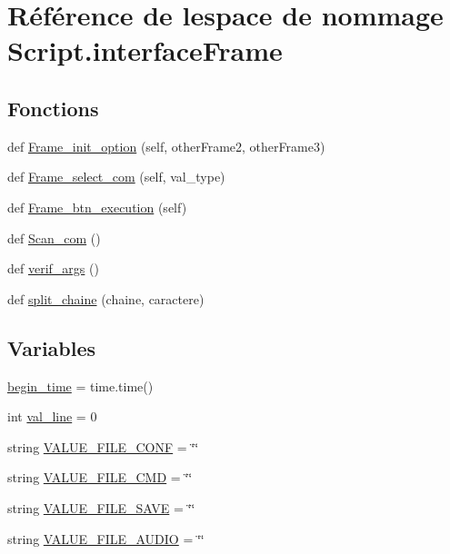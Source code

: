 \hypertarget{namespaceScript_1_1interfaceFrame}{}\section{Référence de l\textquotesingle{}espace de nommage Script.\+interface\+Frame}
\label{namespaceScript_1_1interfaceFrame}
\subsection*{Fonctions}
\begin{DoxyCompactItemize}
\item 
def \hyperlink{namespaceScript_1_1interfaceFrame_aa7f559f2c9e8af048daa456cb3686155}{Frame\+\_\+init\+\_\+option} (self, other\+Frame2, other\+Frame3)
\item 
def \hyperlink{namespaceScript_1_1interfaceFrame_a3538cb8357b74776a380240ed3221bc0}{Frame\+\_\+select\+\_\+com} (self, val\+\_\+type)
\item 
def \hyperlink{namespaceScript_1_1interfaceFrame_ae94a2df22674070fddf2ae5197a09a6f}{Frame\+\_\+btn\+\_\+execution} (self)
\item 
def \hyperlink{namespaceScript_1_1interfaceFrame_a76119121c3aceb43846ba3ea526623ad}{Scan\+\_\+com} ()
\item 
def \hyperlink{namespaceScript_1_1interfaceFrame_a7a90dd83e0b67edcf2dee870d927e98e}{verif\+\_\+args} ()
\item 
def \hyperlink{namespaceScript_1_1interfaceFrame_ab554e77db5080fb2eae78e39ebbeb395}{split\+\_\+chaine} (chaine, caractere)
\end{DoxyCompactItemize}
\subsection*{Variables}
\begin{DoxyCompactItemize}
\item 
\hyperlink{namespaceScript_1_1interfaceFrame_ab8e385a4d6a1f87628b963bc0a385519}{begin\+\_\+time} = time.\+time()
\item 
int \hyperlink{namespaceScript_1_1interfaceFrame_ace1207561541cc3ee3af9b2f33b2a316}{val\+\_\+line} = 0
\item 
string \hyperlink{namespaceScript_1_1interfaceFrame_a2cfacdb24b52e8cf5d9667d91a5c58ab}{V\+A\+L\+U\+E\+\_\+\+F\+I\+L\+E\+\_\+\+C\+O\+NF} = \char`\"{}\char`\"{}
\item 
string \hyperlink{namespaceScript_1_1interfaceFrame_a3704b57444e587c904b839d2dfef2b7e}{V\+A\+L\+U\+E\+\_\+\+F\+I\+L\+E\+\_\+\+C\+MD} = \char`\"{}\char`\"{}
\item 
string \hyperlink{namespaceScript_1_1interfaceFrame_a8933d662775f7e5fc3e0b8e5fb499b24}{V\+A\+L\+U\+E\+\_\+\+F\+I\+L\+E\+\_\+\+S\+A\+VE} = \char`\"{}\char`\"{}
\item 
string \hyperlink{namespaceScript_1_1interfaceFrame_a235ac21d18cefa672100db29db0ed490}{V\+A\+L\+U\+E\+\_\+\+F\+I\+L\+E\+\_\+\+A\+U\+D\+IO} = \char`\"{}\char`\"{}
\end{DoxyCompactItemize}


